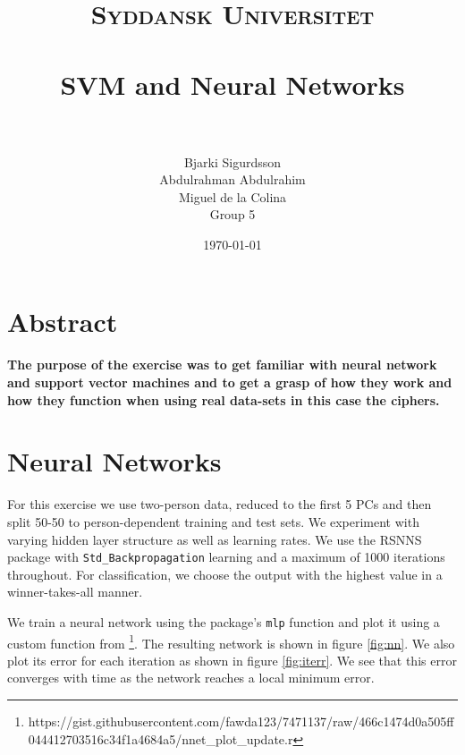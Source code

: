 \documentclass[paper=a4, fontsize=11pt]{scrartcl} %
\title{	
\normalfont \normalsize 
\textsc{Syddansk Universitet} \\ [25pt] 
\horrule{0.5pt} \\[0.4cm] %
\huge SVM and Neural Networks \\ %
\horrule{2pt} \\[0.5cm] %
}
\author{Bjarki Sigurdsson \\ Abdulrahman Abdulrahim \\ Miguel de la Colina \\ Group 5}
\date{\normalsize\today} %
\begin{document}
\maketitle %



\section*{Abstract}

\paragraph{The purpose of the exercise was to get familiar with neural network and support vector machines and to get a grasp of how they work and how they function when using real data-sets in this case the ciphers.}




\section{Neural Networks}
	For this exercise we use two-person data, reduced to the first 5 PCs and then split 50-50 to person-dependent training and test sets. We experiment with varying hidden layer structure as well as learning rates. We use the RSNNS package with \texttt{Std\_Backpropagation} learning and a maximum of 1000 iterations throughout. For classification, we choose the output with the highest value in a winner-takes-all manner.\par
	We train a neural network using the package's \texttt{mlp} function and plot it using a custom function from \footnote{https://gist.githubusercontent.com/fawda123/7471137/raw/466c1474d0a505ff044412703516c34f1a4684a5/nnet\_plot\_update.r}. The resulting network is shown in figure \ref{fig:nn}. We also plot its error for each iteration as shown in figure \ref{fig:iterr}. We see that this error converges with time as the network reaches a local minimum error.
\end{document}
